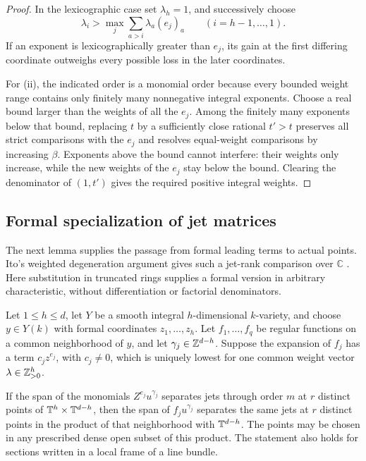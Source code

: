 \begin{proof}
In the lexicographic case set $\lambda_h=1$, and successively choose
\[
 \lambda_i>\max_j\sum_{a>i}\lambda_a(e_j)_a
 \qquad(i=h-1,\ldots,1).
\]
If an exponent is lexicographically greater than $e_j$, its gain at the
first differing coordinate outweighs every possible loss in the later
coordinates.

For (ii), the indicated order is a monomial order because every bounded
weight range contains only finitely many nonnegative integral exponents.
Choose a real bound larger than the weights of all the $e_j$.  Among the
finitely many exponents below that bound, replacing $t$ by a sufficiently
close rational $t'>t$ preserves all strict comparisons with the $e_j$
and resolves equal-weight comparisons by increasing $\beta$.  Exponents
above the bound cannot interfere: their weights only increase, while the
new weights of the $e_j$ stay below the bound.  Clearing the denominator
of $(1,t')$ gives the required positive integral weights.
\end{proof}

\subsection{Formal specialization of jet matrices}

The next lemma supplies the passage from formal leading terms to actual
points.  Ito's weighted degeneration argument gives such a jet-rank
comparison over $\mathbb C$ \cite[Proposition~5.7]{Ito2013}.  Here
substitution in truncated rings supplies a formal version in arbitrary
characteristic, without differentiation or factorial denominators.

\begin{lemma}\label{lem:formal-transfer}
Let $1\leq h\leq d$, let $Y$ be a smooth integral $h$-dimensional
$k$-variety, and choose $y\in Y(k)$ with formal coordinates
$z_1,\ldots,z_h$.  Let $f_1,\ldots,f_q$ be regular functions on a common
neighborhood of $y$, and let $\gamma_j\in\mathbb Z^{d-h}$.
Suppose the expansion of $f_j$ has a term $c_jz^{e_j}$, with
$c_j\neq0$, which is uniquely lowest for one common weight vector
$\lambda\in\mathbb Z_{>0}^h$.

If the span of the monomials $Z^{e_j}u^{\gamma_j}$ separates jets
through order $m$ at $r$ distinct points of $\mathbb T^h\times\mathbb T^{d-h}$,
then the span of $f_ju^{\gamma_j}$ separates the same jets at $r$
distinct points in the product of that neighborhood with $\mathbb T^{d-h}$.
The points may be chosen in any prescribed dense open subset of this
product.  The statement also holds for sections written in a local
frame of a line bundle.
\end{lemma}

